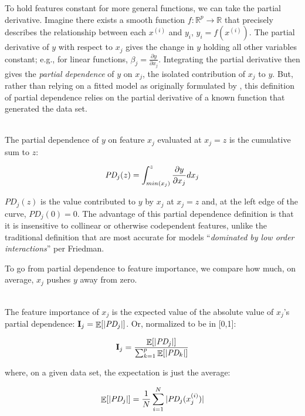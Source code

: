 \documentclass[12pt]{article}
\newcommand{\todo}[1]{{{\color{red}{[#1]}}}}
\newcommand{\Ex}{\mathop{\mathbb{E}}}
\newcommand{\Imp}{\mathbf{I}}
\renewcommand{\xi}{x^{(i)}}
\begin{document}
To hold features constant for more general functions, we can take the partial derivative. Imagine there exists a smooth function $f:\mathbb{R}^{p} \rightarrow \mathbb{R}$ that precisely describes the relationship between each $\xi$ and $y_i$, ${y_i} = f(\xi)$. \todo{should that be $y^{(i)}$ to be consistent?} The partial derivative of $y$ with respect to $x_j$ gives the change in $y$ holding all other variables constant; e.g., for linear functions, $\beta_j = \frac{\partial y}{\partial x_j}$. Integrating the partial derivative then gives the {\em partial dependence}  of $y$ on $x_j$, the isolated contribution of $x_j$ to $y$. But, rather than relying on a fitted model as originally formulated by \cite{PDP}, this definition of partial dependence relies on the partial derivative of a known function that generated the data set.

~\\
 The partial dependence of $y$ on feature $x_j$ evaluated at $x_j = z$ is the cumulative sum to $z$:

\begin{equation}\label{eq:pd}
\text{\it PD}_j(z) = \int_{min(x_j)}^z \frac{\partial y}{\partial x_j} dx_j
\end{equation}

$PD_j(z)$ is the value contributed to $y$ by $x_j$ at $x_j = z$ and, at the left edge of the curve, $PD_j(0)=0$. The advantage of this partial dependence definition is that it is insensitive to collinear or otherwise codependent features, unlike the traditional definition that are most accurate for models ``{\em dominated by low order interactions}'' per Friedman. 

To go from partial dependence to feature importance, we compare how much, on average, $x_j$ pushes $y$ away from zero.

~\\
 The feature importance of $x_j$ is the expected value of the absolute value of $x_j$'s partial dependence: $\Imp_j = \Ex[|\text{\it PD}_j|]$. Or, normalized to be in [0,1]:

\begin{equation}\label{eq:Epd2}
\Imp_j = \frac{\Ex[|\text{\it PD}_j|]}{\sum_{k=1}^p \Ex[|\text{\it PD}_k|]}
\end{equation}

\noindent where, on a given data set, the expectation is just the average:

\begin{equation}\label{eq:Epd}
\Ex[|\text{\it PD}_j|] = \frac{1}{N} \sum_{i=1}^{N} |\text{\it PD}_j(x_j^{(i)})|
\end{equation}
\end{document}
